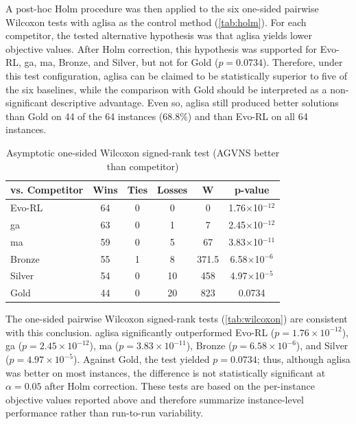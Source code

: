 \documentclass[pdflatex]{sn-jnl}
\begin{document}
A post-hoc Holm procedure was then applied to the six one-sided pairwise
Wilcoxon tests with \gls{aglisa} as the control method
(\autoref{tab:holm}). For each competitor, the tested alternative hypothesis
was that \gls{aglisa} yields lower objective values. After Holm correction, this
hypothesis was supported for Evo-RL, \gls{ga}, \gls{ma}, Bronze, and Silver,
but not for Gold ($p = 0.0734$). Therefore, under this test configuration,
\gls{aglisa} can be claimed to be statistically superior to five of the six
baselines, while the comparison with Gold should be interpreted as a
non-significant descriptive advantage. Even so, \gls{aglisa} still produced
better solutions than Gold on 44 of the 64 instances (68.8\%) and than Evo-RL
on all 64 instances.

\begin{table}[htbp]
\centering
\caption[Wilcoxon signed-rank test]{Asymptotic one-sided Wilcoxon signed-rank test (AGVNS better than competitor)}
\label{tab:wilcoxon}
\begin{tabular*}{0.7\textwidth}{@{\extracolsep{\fill}}lccccc}
\toprule
vs. Competitor & Wins & Ties & Losses & W & p-value \\
\midrule
Evo-RL    & 64 & 0 & 0  & 0   & 1.76$\times$10$^{-12}$ \\
\gls{ga} & 63 & 0 & 1  & 7   & 2.45$\times$10$^{-12}$ \\
\gls{ma} & 59 & 0 & 5  & 67  & 3.83$\times$10$^{-11}$ \\
Bronze    & 55 & 1 & 8  & 371.5 & 6.58$\times$10$^{-6}$ \\
Silver    & 54 & 0 & 10 & 458 & 4.97$\times$10$^{-5}$ \\
Gold      & 44 & 0 & 20 & 823 & 0.0734 \\
\bottomrule
\end{tabular*}
\end{table}

The one-sided pairwise Wilcoxon signed-rank tests
(\autoref{tab:wilcoxon}) are consistent with this conclusion. \gls{aglisa}
significantly outperformed Evo-RL ($p = 1.76 \times 10^{-12}$), \gls{ga}
($p = 2.45 \times 10^{-12}$), \gls{ma} ($p = 3.83 \times 10^{-11}$), Bronze
($p = 6.58 \times 10^{-6}$), and Silver ($p = 4.97 \times 10^{-5}$).
Against Gold, the test yielded $p = 0.0734$; thus, although \gls{aglisa} was
better on most instances, the difference is not statistically significant at
$\alpha = 0.05$ after Holm correction. These tests are based on the
per-instance objective values reported above and therefore summarize
instance-level performance rather than run-to-run variability.
\end{document}
